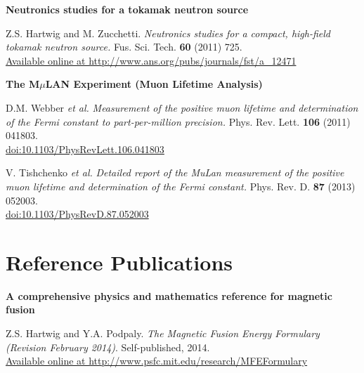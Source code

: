\documentclass[10pt]{article}
\begin{document}
\vspace{0.5cm}

\textbf{Neutronics studies for a tokamak neutron source} 
\begin{innerlist}
\item Z.S. Hartwig and M. Zucchetti. \textit{Neutronics studies for a
  compact, high-field tokamak neutron source.}
  Fus. Sci. Tech. \textbf{60} (2011)
  725.\\ \href{http://www.ans.org/pubs/journals/fst/a_12471}{Available online at http://www.ans.org/pubs/journals/fst/a\_12471}
\end{innerlist}

\vspace{0.5cm}

\textbf{The M$\mu$LAN Experiment (Muon Lifetime Analysis)}
\begin{innerlist}
\item  D.M. Webber \textit{et al.} \textit{Measurement of the positive muon
  lifetime and determination of the Fermi constant to
  part-per-million precision.} Phys. Rev. Lett. \textbf{106} (2011)
  041803.\\
  \href{http://dx.doi.org/10.1103/PhysRevLett.106.041803}{doi:10.1103/PhysRevLett.106.041803}

\item V. Tishchenko \textit{et al.} \textit{Detailed report of the
  MuLan measurement of the positive muon lifetime and determination of
  the Fermi constant.} Phys. Rev. D. \textbf{87} (2013)
    052003.\\ 
    \href{http://dx.doi.org/10.1103/PhysRevD.87.052003}{doi:10.1103/PhysRevD.87.052003}

\end{innerlist}

\section{Reference Publications}
\textbf{A comprehensive physics and mathematics reference for magnetic fusion}
\begin{innerlist}
\item Z.S. Hartwig and Y.A. Podpaly. \textit{The Magnetic Fusion
  Energy Formulary (Revision February 2014)}. Self-published,
  2014. \\ \href{http://www.psfc.mit.edu/research/MFEFormulary}{Available
    online at http://www.psfc.mit.edu/research/MFEFormulary}
\end{innerlist}

\newpage
{}
\end{document}
